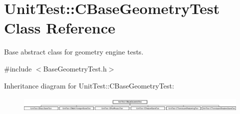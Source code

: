 \hypertarget{class_unit_test_1_1_c_base_geometry_test}{}\section{Unit\+Test\+::C\+Base\+Geometry\+Test Class Reference}
\label{class_unit_test_1_1_c_base_geometry_test}


Base abstract class for geometry engine tests.  




{\ttfamily \#include $<$Base\+Geometry\+Test.\+h$>$}

Inheritance diagram for Unit\+Test\+::C\+Base\+Geometry\+Test\+:\begin{figure}[H]
\begin{center}
\leavevmode
\includegraphics[height=0.732026cm]{class_unit_test_1_1_c_base_geometry_test}
\end{center}
\end{figure}
